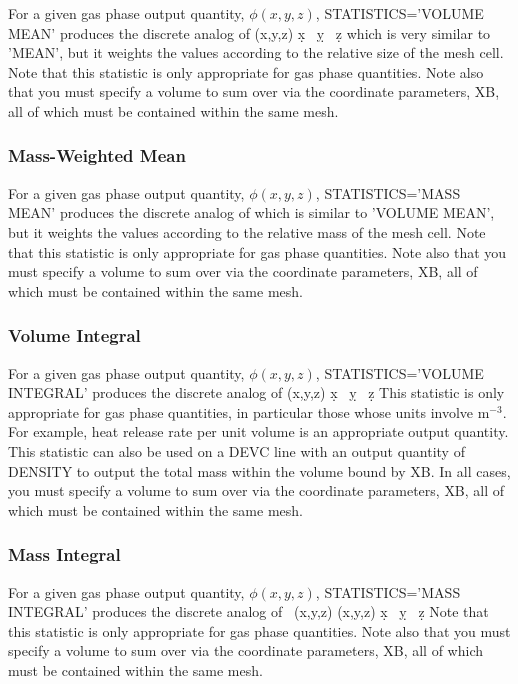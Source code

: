 \documentclass[11pt]{book}
\begin{document}
For a given gas phase output quantity, $\phi(x,y,z)$, {\ct STATISTICS='VOLUME MEAN'} produces the discrete analog of
\be {} \; \int \phi(x,y,z) \; \d x \, \d y \, \d z \ee
which is very similar to {\ct 'MEAN'}, but it weights the values according to the relative size of the mesh cell. Note that this
statistic is only appropriate for gas phase quantities. Note also that you must specify a volume to sum over via the
coordinate parameters, {\ct XB}, all of which must be contained within the same mesh.

\subsubsection{Mass-Weighted Mean}

For a given gas phase output quantity, $\phi(x,y,z)$, {\ct STATISTICS='MASS MEAN'} produces the discrete analog of
\be {}  \ee
which is similar to {\ct 'VOLUME MEAN'}, but it weights the values according to the relative mass of the mesh cell. Note that this
statistic is only appropriate for gas phase quantities. Note also that you must specify a volume to sum over via the
coordinate parameters, {\ct XB}, all of which must be contained within the same mesh.

\subsubsection{Volume Integral}

For a given gas phase output quantity, $\phi(x,y,z)$, {\ct STATISTICS='VOLUME INTEGRAL'} produces the discrete analog of
\be \int \phi(x,y,z) \; \d x \, \d y \, \d z \ee
This statistic is only appropriate for gas phase quantities, in particular those whose units involve m$^{-3}$. For example, heat release rate per unit volume is an appropriate output quantity. This statistic can also be used on a {\ct DEVC} line with an output quantity of {\ct DENSITY} to output the total mass within the volume bound by {\ct XB}. In all cases, you must specify a volume to sum over via the coordinate parameters, {\ct XB}, all of which must be contained within the same mesh.

\subsubsection{Mass Integral}

For a given gas phase output quantity, $\phi(x,y,z)$, {\ct STATISTICS='MASS INTEGRAL'} produces the discrete analog of
\be \int \, \rho(x,y,z) \; \phi(x,y,z) \; \d x \, \d y \, \d z \ee
Note that this statistic is only appropriate for gas phase quantities. Note also that you must specify a volume to sum over via the
coordinate parameters, {\ct XB}, all of which must be contained within the same mesh.
\end{document}
